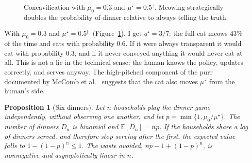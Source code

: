 \documentclass[11pt,a4paper]{article}
\theoremstyle{plain}
\newtheorem{proposicion}[teorema]{Proposition}
\theoremstyle{definition}
\theoremstyle{remark}
\numberwithin{equation}{section}
\newcommand{\E}{\mathbb{E}}
\newcommand{\calib}{{\ensuremath{^{\ddagger}}}}
\begin{document}
\begin{figure}[ht]
\centering
{}
\caption{Concavification with $\mu_0=0.3$ and $\mu^\star=0.5$\calib. Meowing strategically doubles the probability of dinner relative to always telling the truth.}\label{fig:concavo}
\end{figure}

With $\mu_0=0.3$ and $\mu^\star=0.5$\calib\ (Figure~\ref{fig:concavo}), I get $q^\star=3/7$: the full cat meows $43\%$ of the time and eats with probability $0.6$. If it were always transparent it would eat with probability $0.3$, and if it never conveyed anything it would never eat at all. This is not a lie in the technical sense: the human knows the policy, updates correctly, and serves anyway. The high-pitched component of the purr documented by McComb et al.~\cite{mccomb} suggests that the cat also moves $\mu^\star$ from the human's side.

\begin{proposicion}[Six dinners]\label{prop:seis}
Let $n$ households play the dinner game independently, without observing one another, and let $p=\min\{1,\mu_0/\mu^\star\}$. The number of dinners $D_n$ is binomial and $\E[D_n]=np$. If the households share a log of dinners served, and therefore stop serving after the first, the expected value falls to $1-(1-p)^n\le 1$. The waste avoided, $np-1+(1-p)^n$, is nonnegative and asymptotically linear in $n$.
\end{proposicion}
\end{document}
